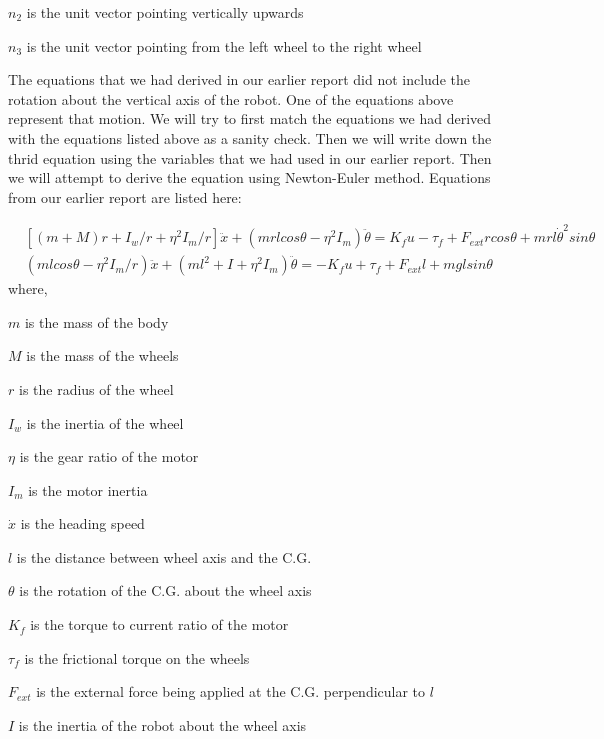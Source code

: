 \documentclass[a4paper,10pt]{article}
\begin{document}
$n_2$ is the unit vector pointing vertically upwards 

$n_3$ is the unit vector pointing from the left wheel to the right wheel \newline

The equations that we had derived in our earlier report \cite{munzir2013balancing} did not include
the rotation about the vertical axis of the robot. One of the equations above represent that motion.
We will try to first match the equations we had derived with the equations listed above as a sanity
check. Then we will write down the thrid equation using the variables that we had used in our 
earlier report. Then we will attempt to derive the equation using Newton-Euler method. Equations from
our earlier report are listed here:

\begin{align}
 &[(m+M)r+I_w/r+\eta^2I_m/r]\ddot{x}+(mrlcos\theta-\eta^2I_m)\ddot{\theta} = K_fu-\tau_f+F_{ext}rcos\theta+mrl\dot{\theta}^2sin\theta \label{eq4}\\
 &(mlcos\theta - \eta^2I_m/r)\ddot{x} + (ml^2 + I + \eta^2I_m)\ddot{\theta} = - K_fu + \tau_f + F_{ext}l + mglsin\theta \label{eq5}
\end{align} where,

$m$ is the mass of the body

$M$ is the mass of the wheels

$r$ is the radius of the wheel

$I_w$ is the inertia of the wheel

$\eta$ is the gear ratio of the motor

$I_m$ is the motor inertia

$\dot{x}$ is the heading speed

$l$ is the distance between wheel axis and the C.G.

$\theta$ is the rotation of the C.G. about the wheel axis

$K_f$ is the torque to current ratio of the motor

$\tau_f$ is the frictional torque on the wheels

$F_{ext}$ is the external force being applied at the C.G. perpendicular to $l$

$I$ is the inertia of the robot about the wheel axis \newline
\end{document}
